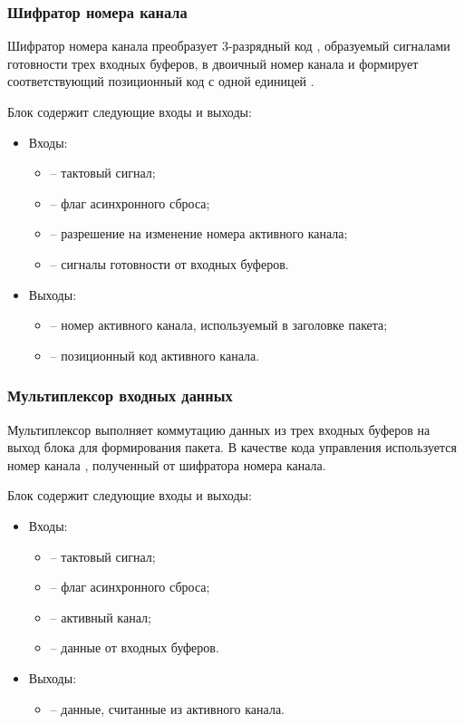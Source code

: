 \subsubsection{Шифратор номера канала}

Шифратор номера канала преобразует 3-разрядный код , образуемый сигналами готовности трех входных буферов, в двоичный номер канала  и формирует соответствующий позиционный код с одной единицей . 

Блок содержит следующие входы и выходы:

\begin{itemize}
	\item Входы:
	\begin{itemize}
		\item {} -- тактовый сигнал;
		\item {} -- флаг асинхронного сброса;
		\item {} -- разрешение на изменение номера активного канала;
		\item {} -- сигналы готовности от входных буферов.
	\end{itemize}
	\item Выходы:
	\begin{itemize}
		\item {} -- номер активного канала, используемый в заголовке пакета;
		\item {} -- позиционный код активного канала.
	\end{itemize}
\end{itemize}

\subsubsection{Мультиплексор входных данных}

Мультиплексор выполняет коммутацию данных из трех входных буферов  на выход блока  для формирования пакета. В качестве кода управления используется номер канала , полученный от шифратора номера канала. 

Блок содержит следующие входы и выходы:

\begin{itemize}
	\item Входы:
	\begin{itemize}
		\item {} -- тактовый сигнал;
		\item {} -- флаг асинхронного сброса;
		\item {} -- активный канал;
		\item {} -- данные от входных буферов.
	\end{itemize}
	\item Выходы:
	\begin{itemize}
		\item {} -- данные, считанные из активного канала.
	\end{itemize}
\end{itemize}

